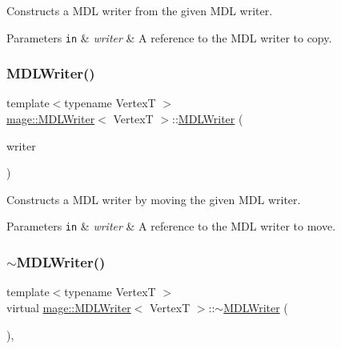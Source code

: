 Constructs a M\+DL writer from the given M\+DL writer.


\begin{DoxyParams}[1]{Parameters}
\mbox{\tt in}  & {\em writer} & A reference to the M\+DL writer to copy. \\
\hline
\end{DoxyParams}
\hypertarget{classmage_1_1_m_d_l_writer_acf2751035dfd4cca9884e6162830c5f5}{}\label{classmage_1_1_m_d_l_writer_acf2751035dfd4cca9884e6162830c5f5} 
\subsubsection{\texorpdfstring{M\+D\+L\+Writer()}{MDLWriter()}\hspace{0.1cm}{\footnotesize\ttfamily [3/3]}}
{\footnotesize\ttfamily template$<$typename VertexT $>$ \\
\hyperlink{classmage_1_1_m_d_l_writer}{mage\+::\+M\+D\+L\+Writer}$<$ VertexT $>$\+::\hyperlink{classmage_1_1_m_d_l_writer}{M\+D\+L\+Writer} (\begin{DoxyParamCaption}\item[{\hyperlink{classmage_1_1_m_d_l_writer}{M\+D\+L\+Writer}$<$ VertexT $>$ \&\&}]{writer }\end{DoxyParamCaption})\hspace{0.3cm}{\ttfamily [delete]}}

Constructs a M\+DL writer by moving the given M\+DL writer.


\begin{DoxyParams}[1]{Parameters}
\mbox{\tt in}  & {\em writer} & A reference to the M\+DL writer to move. \\
\hline
\end{DoxyParams}
\hypertarget{classmage_1_1_m_d_l_writer_adcb78b5d8ac0d665f3bae0b643cd6932}{}\label{classmage_1_1_m_d_l_writer_adcb78b5d8ac0d665f3bae0b643cd6932} 
\subsubsection{\texorpdfstring{$\sim$\+M\+D\+L\+Writer()}{~MDLWriter()}}
{\footnotesize\ttfamily template$<$typename VertexT $>$ \\
virtual \hyperlink{classmage_1_1_m_d_l_writer}{mage\+::\+M\+D\+L\+Writer}$<$ VertexT $>$\+::$\sim$\hyperlink{classmage_1_1_m_d_l_writer}{M\+D\+L\+Writer} (\begin{DoxyParamCaption}{ }\end{DoxyParamCaption})\hspace{0.3cm}{\ttfamily [virtual]}, {\ttfamily [default]}}

